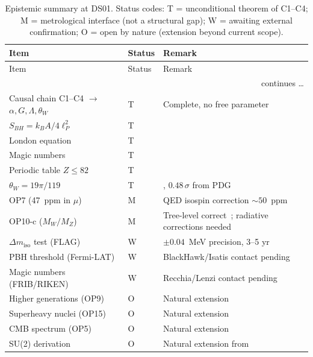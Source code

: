 \documentclass[12pt,a4paper]{article}
\theoremstyle{definition}
\newcommand{\thetaW}{\theta_W}
\newcommand{\Dmiso}{\Delta m_{\mathrm{iso}}}
\begin{document}
\begin{longtable}{p{6.5cm}p{1.2cm}p{6.8cm}}
\caption{Epistemic summary at DS01. Status codes: \textcolor{proofblue}{T} = unconditional theorem of C1--C4; \textcolor{chaingreen}{M} = metrological interface (not a structural gap); \textcolor{waitgrey}{W} = awaiting external confirmation; \textcolor{openred}{O} = open by nature (extension beyond current scope).}
\label{tab:epistemic}\\
\toprule
Item & Status & Remark \\
\midrule
\endfirsthead
\toprule
Item & Status & Remark \\
\midrule
\endhead
\midrule
\multicolumn{3}{r}{\footnotesize continues \ldots}\\
\endfoot
\bottomrule
\endlastfoot
Causal chain C1--C4 $\to$ $\alpha, G, \Lambda, \thetaW$ & \textcolor{proofblue}{T} & Complete, no free parameter~\cite{PDL_D53,PDL_DM} \\[0.3em]
$S_{BH} = k_B A / 4\ell_P^2$ & \textcolor{proofblue}{T} & \cite{PDL_D50} \\[0.3em]
London equation & \textcolor{proofblue}{T} & \cite{PDL_D49} \\[0.3em]
Magic numbers & \textcolor{proofblue}{T} & \cite{PDL_D47} \\[0.3em]
Periodic table $Z \leq 82$ & \textcolor{proofblue}{T} & \cite{PDL_D47} \\[0.3em]
$\thetaW = 19\pi/119$ & \textcolor{proofblue}{T} & \cite{PDL_D55}, $0.48\,\sigma$ from PDG~\cite{PDG2024} \\[0.3em]
OP7 (47~ppm in $\mu$) & \textcolor{chaingreen}{M} & QED isospin correction $\sim 50$~ppm \\[0.3em]
OP10-c ($M_W/M_Z$) & \textcolor{chaingreen}{M} & Tree-level correct~\cite{PDL_D55}; radiative corrections needed \\[0.3em]
$\Dmiso$ test (FLAG) & \textcolor{waitgrey}{W} & $\pm 0.04$~MeV precision, 3--5 yr~\cite{FLAG2024} \\[0.3em]
PBH threshold (Fermi-LAT) & \textcolor{waitgrey}{W} & BlackHawk/Isatis contact pending~\cite{PDL_D45} \\[0.3em]
Magic numbers (FRIB/RIKEN) & \textcolor{waitgrey}{W} & Recchia/Lenzi contact pending~\cite{PDL_D47} \\[0.3em]
Higher generations (OP9) & \textcolor{openred}{O} & Natural extension \\[0.3em]
Superheavy nuclei (OP15) & \textcolor{openred}{O} & Natural extension \\[0.3em]
CMB spectrum (OP5) & \textcolor{openred}{O} & Natural extension~\cite{PDL_D35} \\[0.3em]
SU(2) derivation & \textcolor{openred}{O} & Natural extension from~\cite{PDL_D55} \\[0.3em]
\end{longtable}
\end{document}
